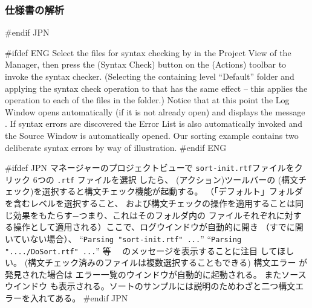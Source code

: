 \documentclass[\pformat,12pt]{article}
\newcommand{\guicmd}[1]{{\sf #1}}
\newcommand{\guicmd}[1]{{\gt #1}}
\begin{document}
\subsubsection{仕様書の解析}
#endif JPN

#ifdef ENG
Select the files for syntax checking by
 in the \guicmd{Project View}
of the \guicmd{Manager}, then press the 
(\guicmd{Syntax Check}) button on the (\guicmd{Actions})
toolbar to invoke the syntax checker. (Selecting the containing level
 ``Default'' folder and applying the syntax check operation to that
 has the same effect -- this applies the operation to each of the
 files in the folder.) Notice that at this point the
\guicmd{Log Window} opens automatically (if it is not already open)
and displays the message 
.
 If syntax
  errors are discovered the \guicmd{Error List} is
also au\-to\-matically invoked and the \guicmd{Source Window} is
automatically opened. Our sorting example contains two
deliberate syntax errors by way of illustration.
#endif ENG

#ifdef JPN
\guicmd{マネージャー}の\guicmd{プロジェクトビュー}で
{
{\tt sort-init.rtf}ファイルをクリック
}
{
6つの {\tt .rtf} ファイルを選択
}
したら、 
(\guicmd{アクション})ツールバーの  
(\guicmd{構文チェック})を選択すると構文チェック機能が起動する。
（「デフォルト」フォルダを含むレベルを選択すること、
および構文チェックの操作を適用することは同じ効果をもたらす−つまり、これはそのフォルダ内の
ファイルそれぞれに対する操作として適用される）ここで、\guicmd{ログウインドウ}が自動的に開き
（すでに開いていない場合）、
{
``{\tt Parsing "sort-init.rtf"
    ...}''
}
{
``{\tt Parsing "..../DoSort.rtf" ...}'' 等
}　のメッセージを表示することに注目
してほしい。
{
(構文チェック済みのファイルは複数選択することもできる)
}
{
} 
構文エラー が発見された場合は
\guicmd{エラー一覧}のウインドウが自動的に起動される。
また\guicmd{ソースウインドウ} も表示される。ソートのサンプルには説明のためわざと二つ構文エラーを入れてある。
#endif JPN
\end{document}
